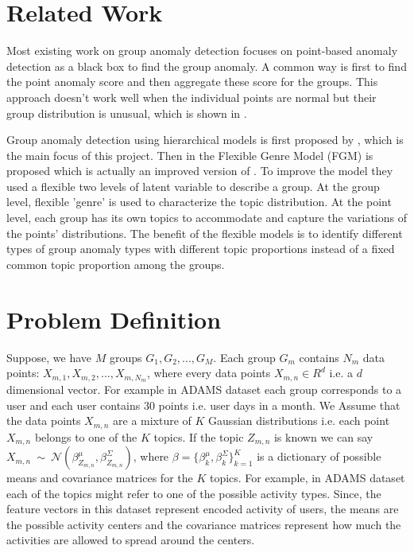 \documentclass[letterpaper]{article}
\begin{document}
\section{Related Work}
\label{sec:relatedwork}

Most existing work on group anomaly detection focuses on point-based anomaly detection as a black box to find the group anomaly. A common way is first to find the point anomaly score and then aggregate these score for the groups. This approach doesn't work well when the individual points are normal but their group distribution is unusual, which is shown in \cite{xiong2011hierarchical}.

Group anomaly detection using hierarchical models is first proposed by \cite{xiong2011hierarchical}, which is the main focus of this project. Then in \cite{xiong2011group} the Flexible Genre Model (FGM) is proposed which is actually an improved version of \cite{xiong2011hierarchical}. To improve the model they used a flexible two levels of latent variable to describe a group. At the group level, flexible 'genre' is used to characterize the topic distribution. At the point level, each group has its own topics to accommodate and capture the variations of the points' distributions. The benefit of the flexible models is to identify different types of group anomaly types with different topic proportions instead of a fixed common topic proportion among the groups.

\section{Problem Definition}
\label{sec:probdef}

Suppose, we have $M$ groups $G_1, G_2, ..., G_M$. Each group $G_m$ contains $N_m$ data points: $X_{m,1}, X_{m,2}, ..., X_{m,N_m}$, where every data points $X_{m,n}\in R^d$ i.e. a $d$ dimensional vector. For example in ADAMS dataset each group corresponds to a user and each user contains 30 points i.e. user days in a month. We Assume that the data points $X_{m,n}$ are a mixture of $K$ Gaussian distributions i.e. each point $X_{m,n}$ belongs to one of the $K$ topics. If the topic $Z_{m,n}$ is known we can say $X_{m,n}\ \sim\ \mathcal{N}(\beta_{Z_{m,n}}^\mu, \beta_{Z_{m,n}}^\Sigma)$, where $\beta=\{\beta_k^\mu, \beta_k^\Sigma\}_{k=1}^K$ is a dictionary of possible means and covariance matrices for the $K$ topics. For example, in ADAMS dataset each of the topics might refer to one of the possible activity types. Since, the feature vectors in this dataset represent encoded activity of users, the means are the possible activity centers and the covariance matrices represent how much the activities are allowed to spread around the centers.
\end{document}

